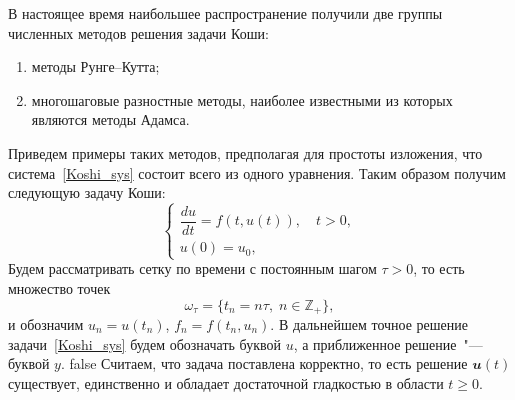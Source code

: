 \documentclass[11pt,a4paper,twoside,listtotoc,bibtotoc]{report}
\numberwithin{equation}{section}
\theoremstyle{definition}
\theoremstyle{plain}
\newcommand{\vfunc}[1]{\mathbfit{#1}}
\begin{document}
В настоящее время наибольшее распространение получили две группы численных
методов решения задачи Коши:
%
\begin{enumerate}
    \item методы Рунге--Кутта;
    \item многошаговые разностные методы, наиболее известными из которых являются
        методы Адамса.
\end{enumerate}
%
Приведем примеры таких методов, предполагая для простоты изложения, что
система~\eqref{Koshi_sys} состоит всего из одного уравнения. Таким образом
получим следующую задачу Коши:
\begin{equation}
%
    \label{Koshi}
    \begin{cases}
        \dfrac{du}{dt} = f(t, u(t)), \quad t > 0, \\
        u(0) = u_0,
    \end{cases}
\end{equation}
Будем рассматривать
сетку по времени с постоянным шагом $\tau > 0$, то есть множество точек
%
$$
    \omega_\tau = \{t_n = n\tau,\;n \in \mathbb{Z}_+\},
$$
%
и обозначим $u_n = u(t_n)$, $f_n = f(t_n, u_n)$.
В дальнейшем точное решение задачи~\eqref{Koshi_sys} будем обозначать буквой $u$,
а приближенное решение~"--- буквой $y$.
\ifx false
Считаем, что задача поставлена корректно, то есть решение $\vfunc{u}(t)$ существует, единственно
и обладает достаточной гладкостью в области $t\geqslant 0$.
\end{document}
